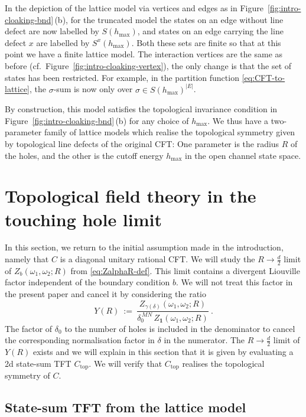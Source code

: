 \documentclass[11pt,a4paper]{article}
\numberwithin{equation}{section}
\newcommand{\one}{\mathbf{1}} %
\begin{document}
In the depiction of the lattice model via vertices and edges as in Figure~\ref{fig:intro-cloaking-bnd}\,(b), for the truncated model the states on an edge without line defect are now labelled by $S(h_\mathrm{max})$, and states on an edge carrying the line defect $x$ are labelled by $S^{x}(h_\mathrm{max})$. Both these sets are finite so that at this point we have a finite lattice model. The interaction vertices are the same as before (cf.\ Figure~\ref{fig:intro-cloaking-vertex}), the only change is that the set of states has been restricted. For example, in the partition function \eqref{eq:CFT-to-lattice}, the $\sigma$-sum is now only over $\sigma \in S(h_\mathrm{max})^{|E|}$.

By construction, this model satisfies the topological invariance condition in Figure~\ref{fig:intro-cloaking-bnd}\,(b) for any choice of $h_\mathrm{max}$. 
We thus have a two-parameter family of lattice models which realise the topological symmetry given by topological line defects of the original CFT: One parameter is the radius $R$ of the holes, and the other is the cutoff energy $h_\mathrm{max}$ in the open channel state space.


\section{Topological field theory in the touching hole limit}\label{sec:TFT}

In this section, we return to the initial assumption made in the introduction, namely that $C$ is a diagonal unitary rational CFT. We will study the $R \to \frac d2$ limit of $Z_b(\omega_1,\omega_2;R)$ from \eqref{eq:ZalphaR-def}. This limit contains a divergent Liouville factor independent of the boundary condition $b$. We will not treat this factor in the present paper and cancel it by considering the ratio \begin{equation}\label{eq:ZZ-ratio-gives-TFT}
Y(R) 
~:=~ \frac{Z_{\gamma(\delta)}(\omega_1,\omega_2;R)}{\delta_0^{\,MN}\,Z_{\one}(\omega_1,\omega_2;R)} ~.
\end{equation}
The factor of $\delta_0$ to the number of holes is included in the denominator to cancel the corresponding normalisation factor in $\delta$ in the numerator.
The $R \to \frac d2$ limit of $Y(R)$ exists and we will explain in this section that it is given by evaluating a 2d state-sum TFT $C_\mathrm{top}$. We will verify that $C_\mathrm{top}$ realises the topological symmetry of $C$.

\subsection{State-sum TFT from the lattice model}
\end{document}

